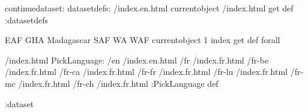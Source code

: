 \begin{ingrid}
continuedataset:
datasetdefs:
/index.en.html currentobject /index.html get def
:datasetdefs

{ EAF GHA Madagascar SAF WA WAF } { currentobject 1 index get def } forall

/index.html {
PickLanguage:
/en /index.en.html
/fr /index.fr.html
/fr-be /index.fr.html
/fr-ca /index.fr.html
/fr-fr /index.fr.html
/fr-lu /index.fr.html
/fr-mc /index.fr.html
/fr-ch /index.fr.html
:PickLanguage
} def

:dataset
\end{ingrid}
